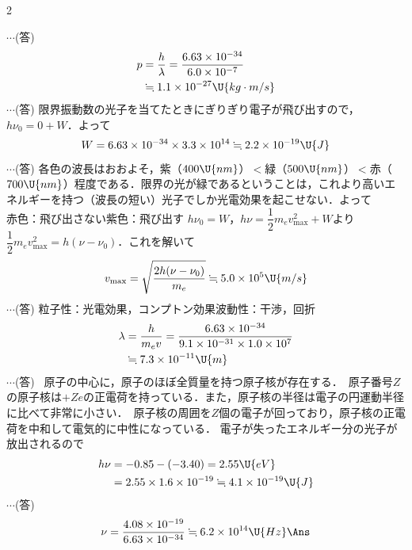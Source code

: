 \begin{multicols}{2}
\begin{komon}
       \hspace*{\fill}$\cdots$(答)
       \[\begin{aligned}p&=\frac{h}{\lambda}=\frac{6.63\times 10^{-34}}{6.0\times 10^{-7}}\\&\fallingdotseq 1.1\times 10^{-27}\U{kg\cdot m/s}\end{aligned}\]
       \hspace*{\fill}$\cdots$(答)
 限界振動数の光子を当てたときにぎりぎり電子が飛び出すので，$h\nu_0=0+W$．よって
       \[W=6.63\times 10^{-34}\times 3.3\times 10^{14}\fallingdotseq 2.2\times 10^{-19}\U{J}\]
       \hspace*{\fill}$\cdots$(答)
 各色の波長はおおよそ，紫（$400\U{nm}$）$<$緑（$500\U{nm}$）$<$赤（$700\U{nm}$）程度である．限界の光が緑であるということは，これより高いエネルギーを持つ（波長の短い）光子でしか光電効果を起こせない．よって\\
       \hspace*{\fill}赤色：飛び出さない\quad 紫色：飛び出す\Ans
{} $h\nu_0=W$，$h\nu=\dfrac{1}{2}m_ev_{\max}^2+W$より$\dfrac{1}{2}m_ev_{\max}^2=h(\nu-\nu_0)$．これを解いて
       \[v_{\max}=\sqrt{\frac{2h(\nu-\nu_0)}{m_e}}\fallingdotseq 5.0\times 10^5\U{m/s}\]
       \hspace*{\fill}$\cdots$(答)
 粒子性：光電効果，コンプトン効果\quad 波動性：干渉，回折\Ans
{} \[\begin{aligned}\lambda&=\frac{h}{m_ev}=\frac{6.63\times 10^{-34}}{9.1\times 10^{-31}\times 1.0\times 10^7}\\&\fallingdotseq 7.3\times 10^{-11}\U{m}\end{aligned}\]
       \hspace*{\fill}$\cdots$(答)
 \ 原子の中心に，原子のほぼ全質量を持つ原子核が存在する．\ 原子番号$Z$の原子核は$+Ze$の正電荷を持っている．また，原子核の半径は電子の円運動半径に比べて非常に小さい．\ 原子核の周囲を$Z$個の電子が回っており，原子核の正電荷を中和して電気的に中性になっている．\Ans
{} 電子が失ったエネルギー分の光子が放出されるので
       \[\begin{aligned}h\nu&=-0.85-(-3.40)=2.55\U{eV}\\&=2.55\times 1.6\times 10^{-19}\fallingdotseq 4.1\times 10^{-19}\U{J}\end{aligned}\]
       \hspace*{\fill}$\cdots$(答)
       \[\nu=\frac{4.08\times 10^{-19}}{6.63\times 10^{-34}}\fallingdotseq 6.2\times 10^{14}\U{Hz}\Ans\]
\end{komon}


\end{multicols}
